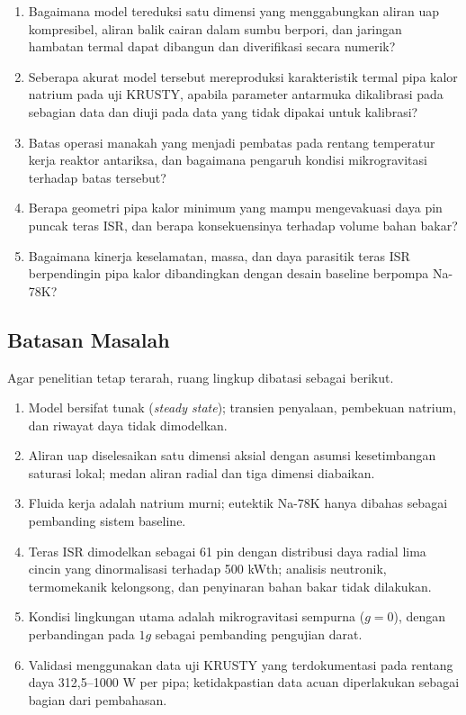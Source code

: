 \documentclass[
  indonesian,
  12pt,
  a4paper,
]{report}
\providecommand{\tightlist}{%
  \setlength{\itemsep}{0pt}\setlength{\parskip}{0pt}}
\begin{document}
\begin{enumerate}
\def\labelenumi{\arabic{enumi}.}
\tightlist
\item
  Bagaimana model tereduksi satu dimensi yang menggabungkan aliran uap
  kompresibel, aliran balik cairan dalam sumbu berpori, dan jaringan
  hambatan termal dapat dibangun dan diverifikasi secara numerik?
\item
  Seberapa akurat model tersebut mereproduksi karakteristik termal pipa
  kalor natrium pada uji KRUSTY, apabila parameter antarmuka dikalibrasi
  pada sebagian data dan diuji pada data yang tidak dipakai untuk
  kalibrasi?
\item
  Batas operasi manakah yang menjadi pembatas pada rentang temperatur
  kerja reaktor antariksa, dan bagaimana pengaruh kondisi mikrogravitasi
  terhadap batas tersebut?
\item
  Berapa geometri pipa kalor minimum yang mampu mengevakuasi daya pin
  puncak teras ISR, dan berapa konsekuensinya terhadap volume bahan
  bakar?
\item
  Bagaimana kinerja keselamatan, massa, dan daya parasitik teras ISR
  berpendingin pipa kalor dibandingkan dengan desain baseline berpompa
  Na-78K?
\end{enumerate}

\subsection{Batasan Masalah}\label{batasan-masalah}

Agar penelitian tetap terarah, ruang lingkup dibatasi sebagai berikut.

\begin{enumerate}
\def\labelenumi{\arabic{enumi}.}
\tightlist
\item
  Model bersifat tunak (\emph{steady state}); transien penyalaan,
  pembekuan natrium, dan riwayat daya tidak dimodelkan.
\item
  Aliran uap diselesaikan satu dimensi aksial dengan asumsi
  kesetimbangan saturasi lokal; medan aliran radial dan tiga dimensi
  diabaikan.
\item
  Fluida kerja adalah natrium murni; eutektik Na-78K hanya dibahas
  sebagai pembanding sistem baseline.
\item
  Teras ISR dimodelkan sebagai 61 pin dengan distribusi daya radial lima
  cincin yang dinormalisasi terhadap 500 kWth; analisis neutronik,
  termomekanik kelongsong, dan penyinaran bahan bakar tidak dilakukan.
\item
  Kondisi lingkungan utama adalah mikrogravitasi sempurna (\(g = 0\)),
  dengan perbandingan pada \(1g\) sebagai pembanding pengujian darat.
\item
  Validasi menggunakan data uji KRUSTY yang terdokumentasi pada rentang
  daya 312,5--1000 W per pipa; ketidakpastian data acuan diperlakukan
  sebagai bagian dari pembahasan.
\end{enumerate}
\end{document}
